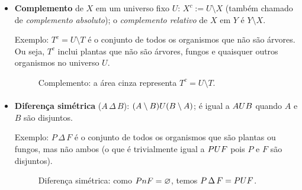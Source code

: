 \documentclass[12pt,a4paper]{article}
\def\cup{\string U}%
\def\cap{\string n}%
\begin{document}
\begin{itemize}
          \paragraph{}
    \item \textbf{Complemento} de \(X\) em um universo fixo \(U\): \(X^c := U\setminus X\) (também chamado de \textit{complemento absoluto}); o \textit{complemento relativo} de \(X\) em \(Y\) é \(Y\setminus X\).

          Exemplo: \(T^c = U \setminus T\) é o conjunto de todos os organismos que não são árvores. Ou seja, \(T^c\) inclui plantas que não são árvores, fungos e quaisquer outros organismos no universo \(U\).
          \begin{figure}[H]
              \centering
              \caption{Complemento: a área cinza representa $T^c = U \setminus T$.}
              \label{fig:op-complemento}
          \end{figure}

          \paragraph{}
    \item \textbf{Diferença simétrica} (\(A\,\Delta\, B\)): \((A\setminus B)\cup(B\setminus A)\); é igual a \(A\cup B\) quando \(A\) e \(B\) são disjuntos.

          Exemplo: \(P\,\Delta\, F\) é o conjunto de todos os organismos que são plantas ou fungos, mas não ambos (o que é trivialmente igual a \(P \cup F\) pois \(P\) e \(F\) são disjuntos).
          \begin{figure}[H]
              \centering
              \caption{Diferença simétrica: como $P \cap F= \varnothing$, temos $P\, \Delta\, F = P \cup F$.}
              \label{fig:op-dif-simetrica}
          \end{figure}


\end{itemize}
\end{document}
